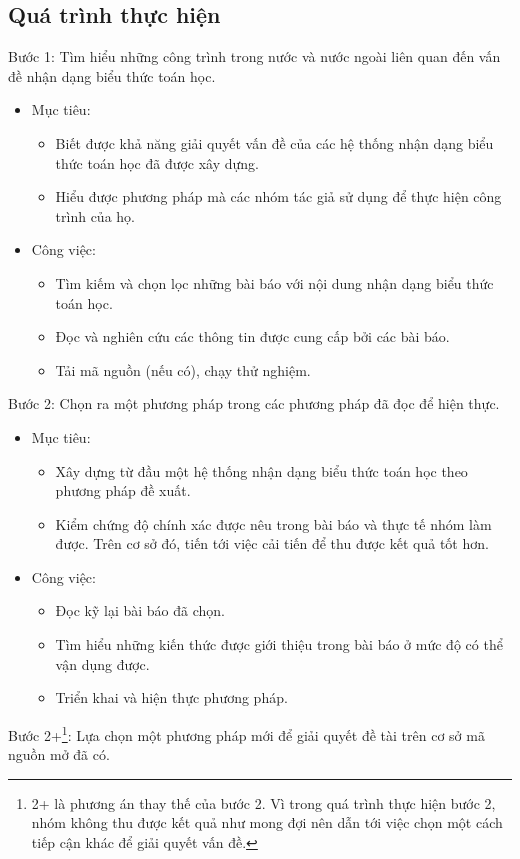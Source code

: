 \documentclass[a4paper,12pt]{article}
\begin{document}
	\subsection{Quá trình thực hiện}
	Bước 1: Tìm hiểu những công trình trong nước và nước ngoài liên quan đến vấn đề nhận dạng biểu thức toán học.
	\begin{itemize}
		\item Mục tiêu: 
		\begin{itemize}
			\item Biết được khả năng giải quyết vấn đề của các hệ thống nhận dạng biểu thức toán học đã được xây dựng.
			\item Hiểu được phương pháp mà các nhóm tác giả sử dụng để thực hiện công trình của họ.
		\end{itemize}
		\item Công việc: 
		\begin{itemize}
			\item Tìm kiếm và chọn lọc những bài báo với nội dung nhận dạng biểu thức toán học.
			\item Đọc và nghiên cứu các thông tin được cung cấp bởi các bài báo.
			\item Tải mã nguồn (nếu có), chạy thử nghiệm.
		\end{itemize}
	\end{itemize}
	Bước 2: Chọn ra một phương pháp trong các phương pháp đã đọc để hiện thực.\\
	\begin{itemize}
		\item Mục tiêu: 
		\begin{itemize}
			\item Xây dựng từ đầu một hệ thống nhận dạng biểu thức toán học theo phương pháp đề xuất.
			\item Kiểm chứng độ chính xác được nêu trong bài báo và thực tế nhóm làm được. Trên cơ sở đó, tiến tới việc cải tiến để thu được kết quả tốt hơn.
		\end{itemize}
		\item Công việc:
		\begin{itemize}
			\item Đọc kỹ lại bài báo đã chọn.
			\item Tìm hiểu những kiến thức được giới thiệu trong bài báo ở mức độ có thể vận dụng được.
			\item Triển khai và hiện thực phương pháp.
		\end{itemize}	
	\end{itemize}
	Bước 2+\footnote{2+ là phương án thay thế của bước 2. Vì trong quá trình thực hiện bước 2, nhóm không thu được kết quả như mong đợi nên dẫn tới việc chọn một cách tiếp cận khác để giải quyết vấn đề.}: Lựa chọn một phương pháp mới để giải quyết đề tài trên cơ sở mã nguồn mở đã có.
	
\end{document}
